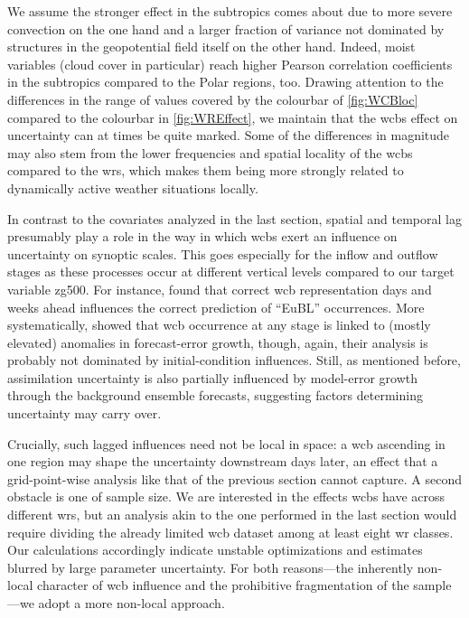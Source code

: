 We assume the stronger effect in the subtropics comes about due to more severe convection on the one hand and a larger fraction of variance not dominated by structures in the geopotential field itself on the other hand. Indeed, moist variables (cloud cover in particular) reach higher Pearson correlation coefficients in the subtropics compared to the Polar regions, too. Drawing attention to the differences in the range of values covered by the colourbar of \cref{fig:WCBloc} compared to the colourbar in \cref{fig:WREffect}, we maintain that the \glspl{wcb} effect on uncertainty can at times be quite marked. Some of the differences in magnitude may also stem from the lower frequencies and spatial locality of the \glspl{wcb} compared to the \glspl{wr}, which makes them being more strongly related to dynamically active weather situations locally.

In contrast to the covariates analyzed in the last section, spatial and temporal lag presumably play a role in the way in which \glspl{wcb} exert an influence on uncertainty on synoptic scales. This goes especially for the inflow and outflow stages as these processes occur at different vertical levels compared to our target variable \gls{zg500}. For instance, \textcite{wandelWhyMoistDynamic2024} found that correct \gls{wcb} representation days and weeks ahead influences the correct prediction of \enquote{EuBL} occurrences. More systematically, \textcite{picklWarmConveyorBelts2023} showed that \gls{wcb} occurrence at any stage is linked to (mostly elevated) anomalies in forecast-error growth, though, again, their analysis is probably not dominated by initial-condition influences. Still, as mentioned before, assimilation uncertainty is also partially influenced by model-error growth through the background ensemble forecasts, suggesting factors determining uncertainty may carry over.


Crucially, such lagged influences need not be local in space: a \gls{wcb} ascending in one region may shape the uncertainty downstream days later, an effect that a grid-point-wise analysis like that of the previous section cannot capture. A second obstacle is one of sample size. We are interested in the effects \glspl{wcb} have across different \glspl{wr}, but an analysis akin to the one performed in the last section would require dividing the already limited \gls{wcb} dataset among at least eight \gls{wr} classes. Our calculations accordingly indicate unstable optimizations and estimates blurred by large parameter uncertainty. For both reasons---the inherently non-local character of \gls{wcb} influence and the prohibitive fragmentation of the sample---we adopt a more non-local
approach.

